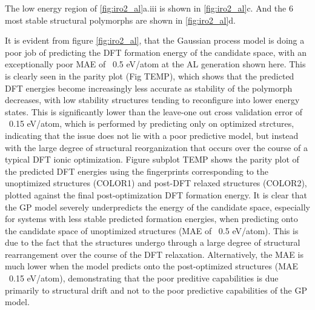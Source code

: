 %
The low energy region of \ref{fig:iro2_al}a.iii is shown in \ref{fig:iro2_al}c.
%
And the 6 most stable structural polymorphs are shown in \ref{fig:iro2_al}d.



%
It is evident from figure \ref{fig:iro2_al}, that the Gaussian process model is doing a poor job of predicting the DFT formation energy of the candidate space, with an exceptionally poor MAE of ~0.5 eV/atom at the AL generation shown here.
%
This is clearly seen in the parity plot (Fig TEMP), which shows that the predicted DFT energies become increasingly less accurate as stability of the polymorph decreases, with low stability structures tending to reconfigure into lower energy states.
%
This is significantly lower than the leave-one out cross validation error of ~0.15 eV/atom, which is performed by predicting only on optimized strctures, indicating that the issue does not lie with a poor predictive model, but instead with the large degree of structural reorganization that occurs over the course of a typical DFT ionic optimization.
%
%
Figure subplot TEMP shows the parity plot of the predicted DFT energies using the fingerprints corresponding to the unoptimized structures (COLOR1) and post-DFT relaxed structures (COLOR2),
plotted against the final post-optimization DFT formation energy.
It is clear that the GP model severely underpredicts the energy of the candidate space, especially for systems with less stable predicted formation energies, when predicting onto the candidate space of unoptimized structures (MAE of ~0.5 eV/atom).
%
This is due to the fact that the structures undergo through a large degree of structural rearrangement over the course of the DFT relaxation.
%
Alternatively, the MAE is much lower when the model predicts onto the post-optimized structures (MAE ~0.15 eV/atom),
demonstrating that the poor preditive capabilities is due primarily to structural drift and not to the poor predictive capabilities of the GP model.
%



